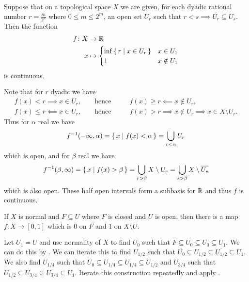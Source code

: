 \documentclass[letterpaper, 11pt, oneside]{book}
\begin{document}
\begin{lem}\label{lem: dyadic_lem_for_urysohn}
  Suppose that on a topological space $X$ we are given, for each dyadic rational number $r = \frac{m}{2^n}$ where $0 \leq m \leq 2^{m}$, an open set $U_{r}$ such that $r < s \implies \overline{U_{r}} \subseteq U_{s}$.
  Then the function
  \begin{align*}
    f\colon X &\to \mathbb{R} \\
      x &\mapsto
          \begin{cases}
            \inf\set{r | x \in U_{r}} & x \in U_{1} \\
            1                         & x \notin U_{1}
          \end{cases}
  \end{align*}
  is continuous.
\end{lem}
\begin{pf}
  Note that for $r$ dyadic we have
  \begin{align*}
    f(x) <    r \implies    x \in U_{r}, && \text{ hence } &&  &f(x) \geq r \impliedby x \notin U_{r}, \\
    f(x) \leq r \impliedby  x \in U_{r}, && \text{ hence } &&  &f(x) > r \implies      x \notin U_{r} \implies x \in X \setminus U_{r}.
  \end{align*}
  Thus for $\alpha$ real we have
  \[
    f^{-1}(-\infty, \alpha) = \set{x | f(x) < \alpha} = \bigcup_{r < \alpha} U_{r}
  \]
  which is open, and for $\beta$ real we have
  \[
    f^{-1}(\beta, \infty) = \set{x | f(x) > \beta} = \bigcup_{r > \beta} X \setminus U_{r} = \bigcup_{s > \beta} X \setminus \overline{U_{s}}
  \]
  which is also open.
  These half open intervals form a subbasis for $\mathbb{R}$ and thus $f$ is continuous.
\end{pf}

\begin{lem}\label{lem: urysohn_lemma}
  If $X$ is normal and $F \subseteq U$ where $F$ is closed and $U$ is open, then there is a map $f\colon X \to [0, 1]$ which is $0$ on $F$ and $1$ on $X \setminus U$.
\end{lem}
\begin{pf}
  Let $U_{1} = U$ and use normality of $X$ to find $U_{0}$ such that $F \subseteq U_{0} \subseteq \overline{U_{0}} \subseteq U_{1}$.
  We can do this by .
  We can iterate this to find $U_{1/2}$ such that $\overline{U_{0}} \subseteq U_{1/2} \subseteq \overline{U_{1/2}} \subseteq U_{1}$.
  We also find $U_{1/4}$ such that $\overline{U_{0}} \subseteq U_{1/4} \subseteq \overline{U_{1/4}} \subseteq U_{1/2}$ and $U_{3/4}$ such that $\overline{U_{1/2}} \subseteq U_{3/4} \subseteq \overline{U_{3/4}} \subseteq U_{1}$.
  Iterate this construction repeatedly and apply .
\end{pf}
\end{document}
